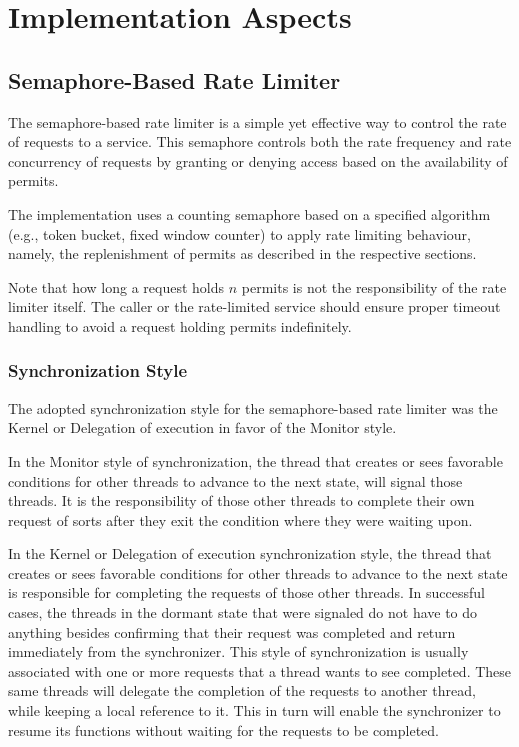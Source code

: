 \section{Implementation Aspects}\label{sec:rate-limiter-implementation}

\subsection{Semaphore-Based Rate Limiter}\label{subsec:rate-limiter-semaphore-based}

The semaphore-based rate limiter is a simple yet effective way to control the rate of requests to a service.
This semaphore controls both the rate frequency and rate concurrency of requests by granting or denying access based on the availability of permits.

The implementation uses a counting semaphore based on a specified algorithm
(e.g., token bucket, fixed window counter) to apply rate limiting behaviour, namely,
the replenishment of permits as described in the respective sections.

Note that how long a request holds $n$ permits is not the responsibility of the rate limiter itself.
The caller or the rate-limited service should ensure proper timeout handling to avoid a request holding permits indefinitely.

\subsubsection{Synchronization Style}\label{subsubsec:rate-limiter-synchronization-style}

The adopted synchronization style for the semaphore-based rate limiter was the Kernel or Delegation of execution in favor of the Monitor style.

In the Monitor style of synchronization, the thread that creates or sees favorable conditions for other threads to advance to the next state, will signal those threads. It is the responsibility of those other threads to complete their own request of sorts after they exit the condition where they were waiting upon.

In the Kernel or Delegation of execution synchronization style,
the thread that creates or sees favorable conditions for other threads to advance to the next state is responsible
for completing the requests of those other threads.
In successful cases,
the threads in the dormant state that were signaled do not have
to do anything besides confirming that their request was completed and return immediately from the synchronizer.
This style of synchronization is usually associated with one or more requests that a thread wants to see completed.
These same threads will delegate the completion of the requests to another thread,
while keeping a local reference to it.
This in turn will enable the synchronizer to resume its functions without waiting for the requests to be completed.

